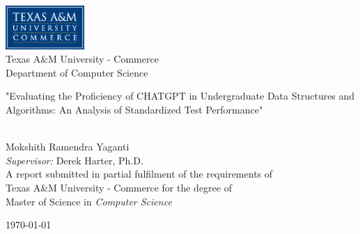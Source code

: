 \documentclass[letterpaper,11pt,oneside]{book}
\begin{document}
    
    \frontmatter
    
    \begin{titlepage}      
        \begin{center}
            \includegraphics[width=3cm]{figures/tamuc-logo.png}\\[0.5cm]
            {\LARGE Texas A\&M University - Commerce\\[0.5cm]
            Department of Computer Science}\\[2cm]
			
            \linespread{1.2}\huge {
                "Evaluating the Proficiency of CHATGPT in Undergraduate Data Structures and Algorithms: An Analysis of Standardized Test Performance"
            
            }
            \linespread{1}~\\[2cm]
            {\Large 
                Mokshith Ramendra Yaganti
            }\\[1cm] 
            

            {\large 
                \emph{Supervisor:} Derek Harter, Ph.D.}\\[1cm] %
            
            \large A report submitted in partial fulfilment of the requirements of\\Texas A\&M University - Commerce for the degree of\\ Master of Science in \textit{Computer Science}\\[0.3cm] 
            \vfill
            
            
            \today %
        \end{center}
    \end{titlepage}
    
\end{document}
